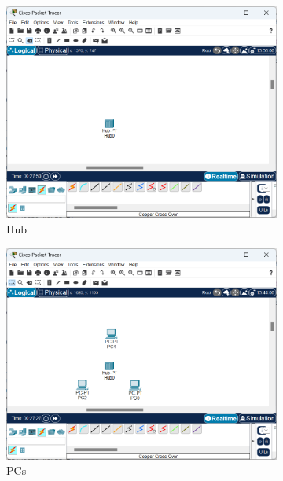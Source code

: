 \begin{figure}
    \centering
    \begin{subfigure}[b]{0.3\textwidth}
        \centering
        \includegraphics[width=\textwidth]{images/hello-world-1.png}
        \caption{Hub}\label{fig:hello-world-1}
    \end{subfigure}
    \begin{subfigure}[b]{0.3\textwidth}
        \centering
        \includegraphics[width=\textwidth]{images/hello-world-2.png}
        \caption{PCs}\label{fig:hello-world-2}
    \end{subfigure}
    \begin{subfigure}[b]{0.3\textwidth}

\end{subfigure}
\end{figure}

